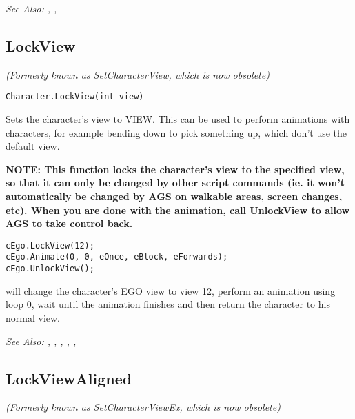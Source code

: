 \it{See Also:} ,
,


\subsection{LockView}\label{Character.LockView}%

\it{(Formerly known as SetCharacterView, which is now obsolete)}

\begin{verbatim}
Character.LockView(int view)
\end{verbatim}

Sets the character's view to VIEW. This can be used to perform animations
with characters, for example bending down to pick something up, which don't
use the default view.

\bf{NOTE:} This function locks the character's view to the specified view, so
that it can only be changed by other script commands (ie. it won't
automatically be changed by AGS on walkable areas, screen changes,
etc). When you are done with the animation, call UnlockView to allow AGS to
take control back.

\begin{verbatim}
cEgo.LockView(12);
cEgo.Animate(0, 0, eOnce, eBlock, eForwards);
cEgo.UnlockView();
\end{verbatim}
will change the character's EGO view to view 12, perform an animation using loop 0,
wait until the animation finishes and then return the character to his normal view.

\it{See Also:} ,
,
,
,
,


\subsection{LockViewAligned}\label{Character.LockViewAligned}%

\it{(Formerly known as SetCharacterViewEx, which is now obsolete)}

